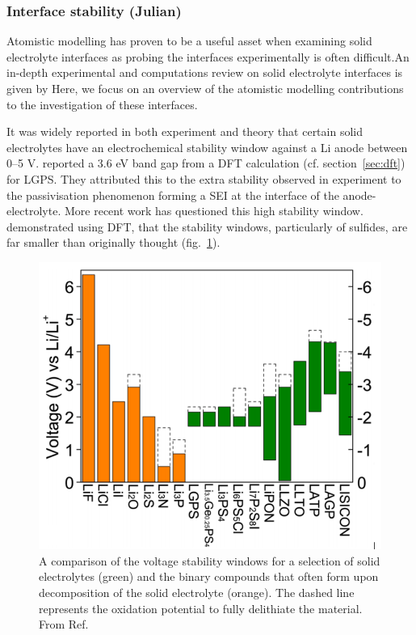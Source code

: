 \documentclass[../main.tex]{subfiles}
\begin{document}
\subsubsection{Interface stability (Julian)}
\label{sec:interface_stability}

Atomistic modelling has proven to be a useful asset when examining solid electrolyte interfaces as probing the interfaces experimentally is often difficult\cite{Xu2018exp}.An in-depth experimental and computations review on solid electrolyte interfaces is given by \citeauthor{Xiao2020interfacerev} \cite{Xiao2020interfacerev} Here, we focus on an overview of the atomistic modelling contributions to the investigation of these interfaces. 

It was widely reported in both experiment\cite{Liu2013, Han2015} and theory\cite{Mo2012} that certain solid electrolytes have an electrochemical stability window against a Li anode between 0--5 V.\cite{Kamaya2011, Thangadurai2005, Liu2013} \citeauthor{Mo2012} reported a 3.6 eV band gap from a DFT calculation (cf. section~\ref{sec:dft}) for LGPS.\cite{Mo2012} They attributed this to the extra stability observed in experiment to the passivisation phenomenon forming a SEI at the interface of the anode-electrolyte.\cite{Kobayashi2008}
More recent work has questioned this high stability window. \citeauthor{Zhu2015} demonstrated using DFT, that the stability windows, particularly of sulfides, are far smaller than originally thought (fig.~\ref{fig:se_stab}).\cite{Zhu2015} 

\begin{figure}[H]
    \centering
    \includegraphics[scale=0.5]{figures/SE_voltage_stability.png}
    \caption{A comparison of the voltage stability windows for a selection of solid electrolytes (green) and the binary compounds that often form upon decomposition of the solid electrolyte (orange). The dashed line represents the oxidation potential to fully delithiate the material. From Ref. }
    \label{fig:se_stab}
\end{figure}
\end{document}
